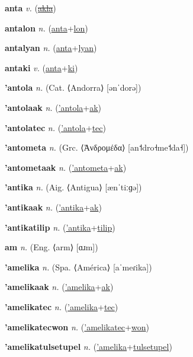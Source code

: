 \textbf{\hypertarget{anta}{anta}} \textit{v.} (\hyperlink{akla}{\sout{akla}})


\textbf{\hypertarget{antalon}{antalon}} \textit{n.} (\hyperlink{anta}{anta}+\allowbreak \hyperlink{lon}{lon})


\textbf{\hypertarget{antalyan}{antalyan}} \textit{n.} (\hyperlink{anta}{anta}+\allowbreak \hyperlink{lyan}{lyan})


\textbf{\hypertarget{antaki}{antaki}} \textit{v.} (\hyperlink{anta}{anta}+\allowbreak \hyperlink{ki}{ki})


\textbf{\hypertarget{'antola}{'antola}} \textit{n.} (Cat. ⟨Andorra⟩ [ənˈdorə])


\textbf{\hypertarget{'antolaak}{'antolaak}} \textit{n.} (\hyperlink{'antola}{'antola}+\allowbreak \hyperlink{ak}{ak})


\textbf{\hypertarget{'antolatec}{'antolatec}} \textit{n.} (\hyperlink{'antola}{'antola}+\allowbreak \hyperlink{tec}{tec})


\textbf{\hypertarget{'antometa}{'antometa}} \textit{n.} (Grc. ⟨Ἀνδρομέδα⟩ [an˦dro˧me˦da˧])


\textbf{\hypertarget{'antometaak}{'antometaak}} \textit{n.} (\hyperlink{'antometa}{'antometa}+\allowbreak \hyperlink{ak}{ak})


\textbf{\hypertarget{'antika}{'antika}} \textit{n.} (Aig. ⟨Antigua⟩ [ænˈtiːɡə])


\textbf{\hypertarget{'antikaak}{'antikaak}} \textit{n.} (\hyperlink{'antika}{'antika}+\allowbreak \hyperlink{ak}{ak})


\textbf{\hypertarget{'antikatilip}{'antikatilip}} \textit{n.} (\hyperlink{'antika}{'antika}+\allowbreak \hyperlink{tilip}{tilip})


\textbf{\hypertarget{am}{am}} \textit{n.} (Eng. ⟨arm⟩ [ɑɹm])


\textbf{\hypertarget{'amelika}{'amelika}} \textit{n.} (Spa. ⟨América⟩ [aˈmeɾika])


\textbf{\hypertarget{'amelikaak}{'amelikaak}} \textit{n.} (\hyperlink{'amelika}{'amelika}+\allowbreak \hyperlink{ak}{ak})


\textbf{\hypertarget{'amelikatec}{'amelikatec}} \textit{n.} (\hyperlink{'amelika}{'amelika}+\allowbreak \hyperlink{tec}{tec})


\textbf{\hypertarget{'amelikatecwon}{'amelikatecwon}} \textit{n.} (\hyperlink{'amelikatec}{'amelikatec}+\allowbreak \hyperlink{won}{won})


\textbf{\hypertarget{'amelikatulsetupel}{'amelikatulsetupel}} \textit{n.} (\hyperlink{'amelika}{'amelika}+\allowbreak \hyperlink{tulsetupel}{tulsetupel})


